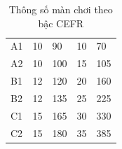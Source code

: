 \begin{table}[!ht]
    \centering
    \caption{Thông số màn chơi theo bậc CEFR}
    \label{tab:cefr_stage_parameters}
    \begin{tabularx}{\textwidth}{|C{1.5cm}|C{2.5cm}|C{2.6cm}|C{3.0cm}|C{2.5cm}|}
        \hline
         &  &  &  &  \\ \hline
        A1 & 10 & 90 & 10 & 70 \\ \hline
        A2 & 10 & 100 & 15 & 105 \\ \hline
        B1 & 12 & 120 & 20 & 160 \\ \hline
        B2 & 12 & 135 & 25 & 225 \\ \hline
        C1 & 15 & 165 & 30 & 330 \\ \hline
        C2 & 15 & 180 & 35 & 385 \\ \hline
    \end{tabularx}
\end{table}
\FloatBarrier

